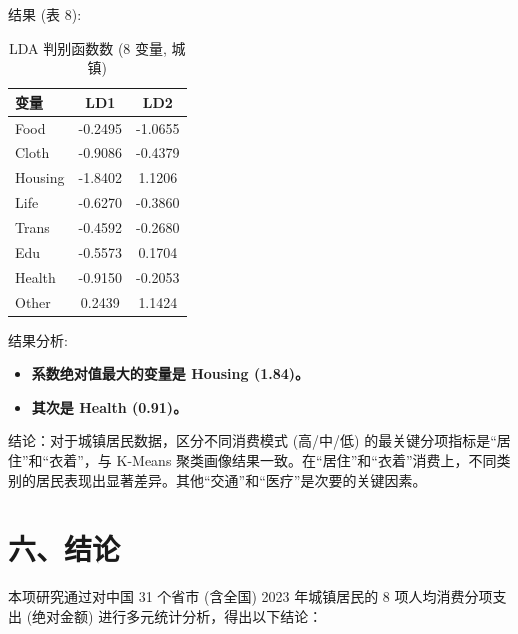 \documentclass[12pt, a4paper]{article}
\begin{document}
\noindent 结果 (表 8):
\begin{table}[H]
    \centering
    \caption{LDA 判别函数数 (8 变量, 城镇)}
    \label{tab:lda_coefficients}
    \begin{tabularx}{\textwidth}{X|c|c}
        \toprule
        \textbf{变量} & \textbf{LD1} & \textbf{LD2} \\
        \midrule
        Food & -0.2495 & -1.0655 \\
        Cloth & -0.9086 & -0.4379 \\
        Housing & -1.8402 & 1.1206 \\
        Life & -0.6270 & -0.3860 \\
        Trans & -0.4592 & -0.2680 \\
        Edu & -0.5573 & 0.1704 \\
        Health & -0.9150 & -0.2053 \\
        Other & 0.2439 & 1.1424 \\
        \bottomrule
    \end{tabularx}
\end{table}

\noindent 结果分析:
\begin{itemize}
    \item \textbf{系数绝对值最大的变量是 Housing (1.84)。}
    \item \textbf{其次是 Health (0.91)。}
\end{itemize}

\noindent 结论：对于城镇居民数据，区分不同消费模式 (高/中/低) 的最关键分项指标是“居住”和“衣着”，与 K-Means 聚类画像结果一致。在“居住”和“衣着”消费上，不同类别的居民表现出显著差异。其他“交通”和“医疗”是次要的关键因素。

\section*{\centering 六、结论}
\noindent 本项研究通过对中国 31 个省市 (含全国) 2023 年城镇居民的 8 项人均消费分项支出 (绝对金额) 进行多元统计分析，得出以下结论：
\end{document}
